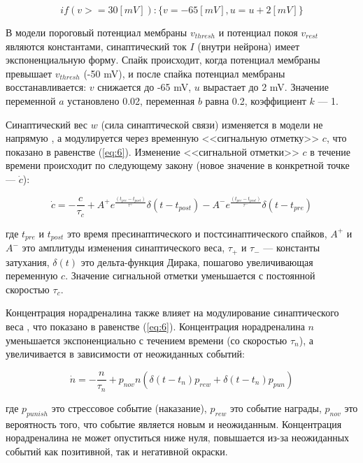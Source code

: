\begin{equation}\label{eq:3}
if (v >= 30 [mV]) : \{v = - 65 [mV], u = u + 2 [mV]\}
\end{equation}


В модели пороговый потенциал мембраны $v_{thresh}$ и потенциал покоя $v_{rest}$ являются константами, синаптический ток $I$ (внутри нейрона) имеет экспоненциальную форму. Спайк происходит, когда потенциал мембраны превышает $v_{thresh}$ (-50 mV), и после спайка потенциал мембраны восстанавливается: $v$ снижается до -65 mV, $u$ вырастает до 2 mV. Значение переменной $a$ установлено 0.02, переменная $b$ равна 0.2, коэффициент $k$ --- 1.


Синаптический вес $w$ (сила синаптической связи) изменяется в модели не напрямую \cite{stdp}, а модулируется через временную <<сигнальную отметку>> $c$, что показано в равенстве (\ref{eq:6}). Изменение <<сигнальной отметки>> $c$ в течение времени происходит по следующему закону (новое значение в конкретной точке --- $\dot{c}$):


\begin{equation}\label{eq:4}
\dot{c} =  -\frac{c}{\tau_c} + A^+e^{\frac{(t_{pre} - t_{post})}{\tau^+}}\delta(t - t_{post})  -A^-e^{  \frac{(t_{pre} - t_{post})}{\tau^-}}\delta(t - t_{pre} )
\end{equation}


где $t_{pre}$ и $t_{post}$ это время пресинаптического и постсинаптического спайков, $A^+$ и $A^-$ это амплитуды изменения синаптического веса, $\tau_+$ и $\tau_-$ --- константы затухания, $\delta(t)$ это дельта-функция Дирака, пошагово увеличивающая переменную $c$. Значение сигнальной отметки уменьшается с постоянной скоростью $\tau_c$. 


Концентрация норадреналина также влияет на модулирование синаптического веса \cite{nora1}\cite{nora2}, что показано в равенстве (\ref{eq:6}). Концентрация норадреналина $n$ уменьшается экспоненциально с течением времени (со скоростью $\tau_n$), а увеличивается в зависимости от неожиданных событий:


\begin{equation}\label{eq:5}
\dot{n} = -\frac{n}{\tau_n} + p_{nov}n (\delta(t - t_n)p_{rew} + \delta(t - t_n)p_{pun})
\end{equation}


где $p_{punish}$ это стрессовое событие (наказание), $p_{rew}$ это событие награды, $p_{nov}$ это вероятность того, что событие является новым и неожиданным. Концентрация норадреналина не может опуститься ниже нуля, повышается из-за неожиданных событий как позитивной, так и негативной окраски.


